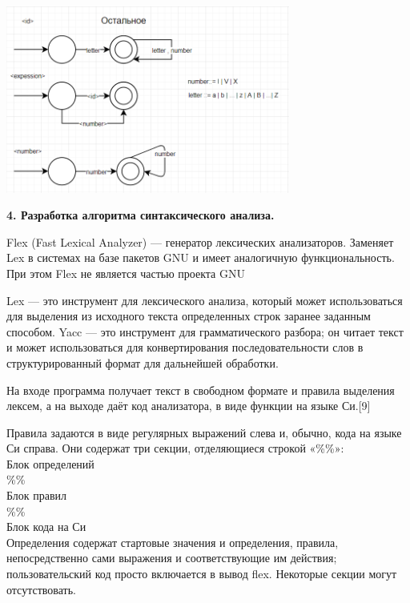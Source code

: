 \documentclass[12pt]{report}
\begin{document}
\begin{center}
\includegraphics[width=0.7\textwidth]{assets/Other.png}
\end{center}

\begin{center}
\Large{\textbf{4. Разработка алгоритма синтаксического анализа.}}
\end{center}
\text{}\newline

Flex (Fast Lexical Analyzer) — генератор лексических анализаторов. Заменяет Lex в системах на базе пакетов GNU и имеет аналогичную функциональность. При этом Flex не является частью проекта GNU

Lex — это инструмент для лексического анализа, который может использоваться для выделения из исходного текста определенных строк заранее заданным способом. Yacc — это инструмент для грамматического разбора; он читает текст и может использоваться для конвертирования последовательности слов в структурированный формат для дальнейшей обработки.

На входе программа получает текст в свободном формате и правила выделения лексем, а на выходе даёт код анализатора, в виде функции на языке Си.[9]

Правила задаются в виде регулярных выражений слева и, обычно, кода на языке Си справа. Они содержат три секции, отделяющиеся строкой «\%\%»:
\text{}\newline \\
Блок определений \\
\%\% \\
Блок правил \\
\%\% \\
Блок кода на Си \\

Определения содержат стартовые значения и определения, правила, непосредственно сами выражения и соответствующие им действия; пользовательский код просто включается в вывод flex. Некоторые секции могут отсутствовать.
\end{document}
